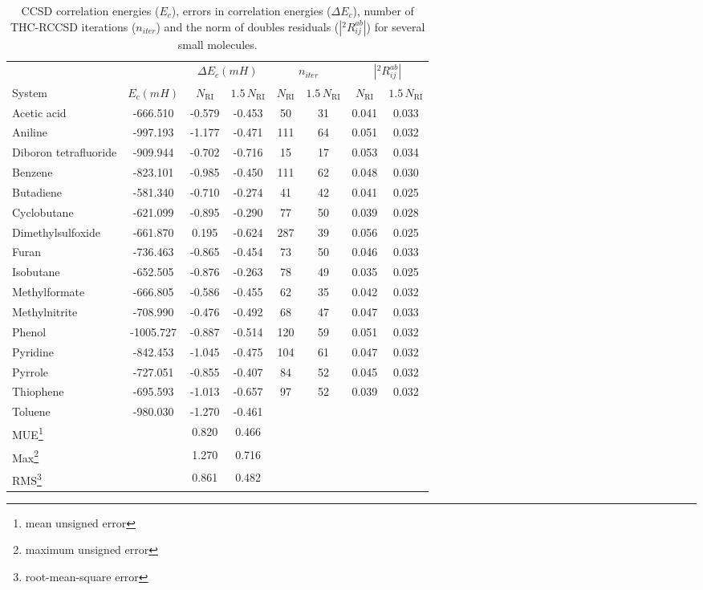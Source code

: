 \begin{center}
\begin{table}[h]
\caption{CCSD correlation energies ($E_c$), errors in
correlation energies ($\Delta E_c$), number of THC-RCCSD iterations 
($n_{iter}$) 
and the norm of doubles residuals ($|{}^2R_{ij}^{ab}|$) for several small 
molecules.
\label{Tab:Energies}}
\begin{tabular}{lccccccc}
& & \multicolumn{2}{c}{$\Delta E_c (mH)$} & \multicolumn{2}{c}{$n_{iter}$} & 
\multicolumn{2}{c}{$|{}^2R_{ij}^{ab}|$}\\
\cline{3-4} \cline{5-6} \cline{7-8} System & $E_c (mH)$ & $N_\mathrm{RI}$ &
$1.5 \, N_\mathrm{RI}$ & $N_\mathrm{RI}$ &
$1.5 \, N_\mathrm{RI}$ & $N_\mathrm{RI}$ &
$1.5 \, N_\mathrm{RI}$\\
\hline
Acetic acid & -666.510 & -0.579 & -0.453 & 50 & 31 & 0.041 & 0.033 \\
Aniline & -997.193 & -1.177 & -0.471 & 111 & 64 & 0.051 & 0.032 \\
Diboron tetrafluoride & -909.944 & -0.702 & -0.716 & 15 & 17 & 0.053 & 0.034\\
Benzene & -823.101 & -0.985 & -0.450 & 111 & 62 & 0.048 & 0.030\\
Butadiene & -581.340 & -0.710 & -0.274 & 41 & 42 & 0.041 & 0.025\\
Cyclobutane & -621.099 & -0.895 & -0.290 & 77 & 50 & 0.039 & 0.028\\
Dimethylsulfoxide & -661.870 & 0.195 & -0.624 & 287 & 39 & 0.056 & 0.025\\
Furan & -736.463 & -0.865 & -0.454 & 73 & 50 & 0.046 & 0.033\\
Isobutane & -652.505 & -0.876 & -0.263 & 78 & 49 & 0.035 & 0.025\\
Methylformate & -666.805 & -0.586 & -0.455 & 62 & 35 & 0.042 & 0.032\\
Methylnitrite & -708.990 & -0.476 & -0.492 & 68 & 47 & 0.047 & 0.033\\
Phenol & -1005.727 & -0.887 & -0.514 & 120 & 59 & 0.051 & 0.032\\
Pyridine & -842.453 & -1.045 & -0.475 & 104 & 61 & 0.047 & 0.032\\
Pyrrole & -727.051 & -0.855 & -0.407 & 84 & 52 & 0.045 & 0.032\\
Thiophene & -695.593 & -1.013 & -0.657 & 97 & 52 & 0.039 & 0.032\\
Toluene & -980.030 & -1.270 & -0.461 & & & &\\
\hline
MUE\footnote{mean unsigned error} & & 0.820 & 0.466 & & & &\\
Max\footnote{maximum unsigned error} & & 1.270 & 0.716 & & & &\\
RMS\footnote{root-mean-square error} & & 0.861 & 0.482 & & & &\\
\end{tabular}
\end{table}

\end{center}
